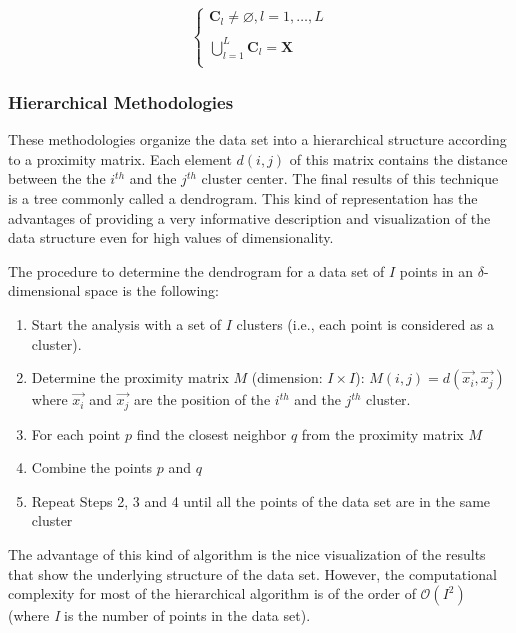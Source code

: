     \begin{equation}\label{eq: ClassRequier}
        \begin{cases} \mathbf{C}_{l}\neq\varnothing, l=1,\ldots,L \\
                        \\
                     \bigcup_{l=1}^{L}\mathbf{C}_{l}= \mathbf{X} \\
        \end{cases}
    \end{equation}

\subsubsection{Hierarchical Methodologies}
\label{Hierarchical}

These methodologies organize the data set into a hierarchical structure according to a proximity matrix. Each element $d(i,j)$ of this matrix contains the distance between the the $i^{th}$ and the $j^{th}$ cluster center. The final results of this technique is a tree commonly called a dendrogram. This kind of representation has the advantages of providing a very informative description and visualization of the data structure even for high values of dimensionality.

The procedure to determine the dendrogram for a data set of $I$ points in an $\delta$-dimensional space is the following:

\begin{enumerate}
  \item Start the analysis with a set of $I$ clusters (i.e., each point is considered as a cluster).
  \item Determine the proximity matrix $M$ (dimension: $I\times I$): $M(i,j)= d(\vec{x_{i}},\vec{x_{j}})$ where $\vec{x_{i}}$ and $\vec{x_{j}}$ are the position of the $i^{th}$ and the $j^{th}$ cluster.
  \item For each point $p$ find the closest neighbor $q$  from the proximity matrix $M$
  \item Combine the points $p$ and $q$
  \item Repeat Steps 2, 3 and 4 until all the points of the data set are in the same cluster
\end{enumerate}

The advantage of this kind of algorithm is the nice visualization of the results that show the underlying structure of the data set. However, the computational complexity for most of the hierarchical algorithm is of the order of $\mathcal{O}(I^{2})$ (where \emph{I} is the number of points in the data set).

